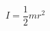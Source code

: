 \documentclass[uplatex,dvipdfmx]{jsarticle}
\begin{document}
\begin{equation}
I = \frac{1}{2} m r^2
\label{eq:kansemome}
\end{equation}


\end{document}
